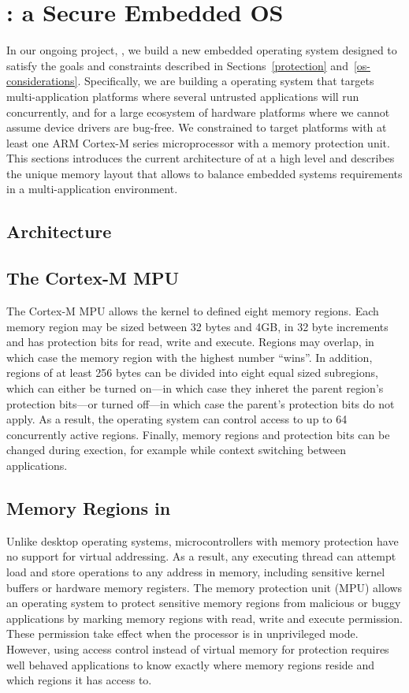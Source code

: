 \section{\name: a Secure Embedded OS}

In our ongoing project, \name, we build a new embedded operating system designed
to satisfy the goals and constraints described in Sections~\ref{protection}
and~\ref{os-considerations}. Specifically, we are building a operating system
that targets multi-application platforms where several untrusted applications
will run concurrently, and for a large ecosystem of hardware platforms where we
cannot assume device drivers are bug-free. We constrained \name to target
platforms with at least one ARM Cortex-M series microprocessor with a memory
protection unit. This sections introduces the current architecture of \name at a
high level and describes the unique memory layout that allows \name to balance
embedded systems requirements in a multi-application environment.

\subsection{Architecture}

\subsection{The Cortex-M MPU}

The Cortex-M MPU allows the kernel to defined eight memory regions. Each memory
region may be sized between 32 bytes and 4GB, in 32 byte increments and has
protection bits for read, write and execute. Regions may overlap, in which case
the memory region with the highest number ``wins''. In addition, regions of at
least 256 bytes can be divided into eight equal sized subregions, which can
either be turned on---in which case they inheret the parent region's protection
bits---or turned off---in which case the parent's protection bits do not apply.
As a result, the operating system can control access to up to 64 concurrently
active regions. Finally, memory regions and protection bits can be changed
during exection, for example while context switching between applications.

\subsection{Memory Regions in \name}

Unlike desktop operating systems, microcontrollers with memory protection have
no support for virtual addressing. As a result, any executing thread can attempt
load and store operations to any address in memory, including sensitive kernel
buffers or hardware memory registers. The memory protection unit (MPU) allows an
operating system to protect sensitive memory regions from malicious or buggy
applications by marking memory regions with read, write and execute permission.
These permission take effect when the processor is in unprivileged mode.
However, using access control instead of virtual memory for protection requires
well behaved applications to know exactly where memory regions reside and which
regions it has access to.

